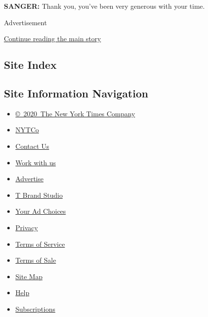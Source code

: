 \textbf{SANGER:} Thank you, you've been very generous with your time.

Advertisement

\protect\hyperlink{after-bottom}{Continue reading the main story}

\hypertarget{site-index}{%
\subsection{Site Index}\label{site-index}}

\hypertarget{site-information-navigation}{%
\subsection{Site Information
Navigation}\label{site-information-navigation}}

\begin{itemize}
\tightlist
\item
  \href{https://help.nytimes.com/hc/en-us/articles/115014792127-Copyright-notice}{©~2020~The
  New York Times Company}
\end{itemize}

\begin{itemize}
\tightlist
\item
  \href{https://www.nytco.com/}{NYTCo}
\item
  \href{https://help.nytimes.com/hc/en-us/articles/115015385887-Contact-Us}{Contact
  Us}
\item
  \href{https://www.nytco.com/careers/}{Work with us}
\item
  \href{https://nytmediakit.com/}{Advertise}
\item
  \href{http://www.tbrandstudio.com/}{T Brand Studio}
\item
  \href{https://www.nytimes.com/privacy/cookie-policy\#how-do-i-manage-trackers}{Your
  Ad Choices}
\item
  \href{https://www.nytimes.com/privacy}{Privacy}
\item
  \href{https://help.nytimes.com/hc/en-us/articles/115014893428-Terms-of-service}{Terms
  of Service}
\item
  \href{https://help.nytimes.com/hc/en-us/articles/115014893968-Terms-of-sale}{Terms
  of Sale}
\item
  \href{https://spiderbites.nytimes.com}{Site Map}
\item
  \href{https://help.nytimes.com/hc/en-us}{Help}
\item
  \href{https://www.nytimes.com/subscription?campaignId=37WXW}{Subscriptions}
\end{itemize}
